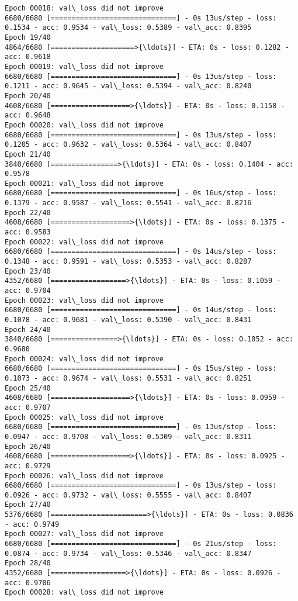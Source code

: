 \documentclass[11pt]{article}
\begin{document}
\begin{Verbatim}[commandchars=\\\{\}]
Epoch 00018: val\_loss did not improve
6680/6680 [==============================] - 0s 13us/step - loss: 0.1534 - acc: 0.9534 - val\_loss: 0.5389 - val\_acc: 0.8395
Epoch 19/40
4864/6680 [====================>{\ldots}] - ETA: 0s - loss: 0.1282 - acc: 0.9618
Epoch 00019: val\_loss did not improve
6680/6680 [==============================] - 0s 13us/step - loss: 0.1211 - acc: 0.9645 - val\_loss: 0.5394 - val\_acc: 0.8240
Epoch 20/40
4608/6680 [===================>{\ldots}] - ETA: 0s - loss: 0.1158 - acc: 0.9648
Epoch 00020: val\_loss did not improve
6680/6680 [==============================] - 0s 13us/step - loss: 0.1205 - acc: 0.9632 - val\_loss: 0.5364 - val\_acc: 0.8407
Epoch 21/40
3840/6680 [================>{\ldots}] - ETA: 0s - loss: 0.1404 - acc: 0.9578
Epoch 00021: val\_loss did not improve
6680/6680 [==============================] - 0s 16us/step - loss: 0.1379 - acc: 0.9587 - val\_loss: 0.5541 - val\_acc: 0.8216
Epoch 22/40
4608/6680 [===================>{\ldots}] - ETA: 0s - loss: 0.1375 - acc: 0.9583
Epoch 00022: val\_loss did not improve
6680/6680 [==============================] - 0s 14us/step - loss: 0.1348 - acc: 0.9591 - val\_loss: 0.5353 - val\_acc: 0.8287
Epoch 23/40
4352/6680 [==================>{\ldots}] - ETA: 0s - loss: 0.1059 - acc: 0.9704
Epoch 00023: val\_loss did not improve
6680/6680 [==============================] - 0s 14us/step - loss: 0.1078 - acc: 0.9681 - val\_loss: 0.5390 - val\_acc: 0.8431
Epoch 24/40
3840/6680 [================>{\ldots}] - ETA: 0s - loss: 0.1052 - acc: 0.9680
Epoch 00024: val\_loss did not improve
6680/6680 [==============================] - 0s 15us/step - loss: 0.1073 - acc: 0.9674 - val\_loss: 0.5531 - val\_acc: 0.8251
Epoch 25/40
4608/6680 [===================>{\ldots}] - ETA: 0s - loss: 0.0959 - acc: 0.9707
Epoch 00025: val\_loss did not improve
6680/6680 [==============================] - 0s 13us/step - loss: 0.0947 - acc: 0.9708 - val\_loss: 0.5309 - val\_acc: 0.8311
Epoch 26/40
4608/6680 [===================>{\ldots}] - ETA: 0s - loss: 0.0925 - acc: 0.9729
Epoch 00026: val\_loss did not improve
6680/6680 [==============================] - 0s 13us/step - loss: 0.0926 - acc: 0.9732 - val\_loss: 0.5555 - val\_acc: 0.8407
Epoch 27/40
5376/6680 [=======================>{\ldots}] - ETA: 0s - loss: 0.0836 - acc: 0.9749
Epoch 00027: val\_loss did not improve
6680/6680 [==============================] - 0s 21us/step - loss: 0.0874 - acc: 0.9734 - val\_loss: 0.5346 - val\_acc: 0.8347
Epoch 28/40
4352/6680 [==================>{\ldots}] - ETA: 0s - loss: 0.0926 - acc: 0.9706
Epoch 00028: val\_loss did not improve

\end{Verbatim}
\end{document}
